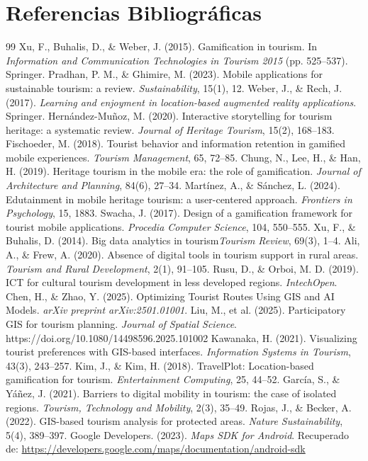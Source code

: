 \documentclass[12pt]{article}
\begin{document}
\section{Referencias Bibliográficas}

\begin{thebibliography}{99}
     Xu, F., Buhalis, D., \& Weber, J. (2015). Gamification in tourism. In \textit{Information and Communication Technologies in Tourism 2015} (pp. 525–537). Springer.
     Pradhan, P. M., \& Ghimire, M. (2023). Mobile applications for sustainable tourism: a review. \textit{Sustainability}, 15(1), 12.
     Weber, J., \& Rech, J. (2017). \textit{Learning and enjoyment in location-based augmented reality applications}. Springer.
     Hernández-Muñoz, M. (2020). Interactive storytelling for tourism heritage: a systematic review. \textit{Journal of Heritage Tourism}, 15(2), 168–183.
     Fischoeder, M. (2018). Tourist behavior and information retention in gamified mobile experiences. \textit{Tourism Management}, 65, 72–85.
     Chung, N., Lee, H., \& Han, H. (2019). Heritage tourism in the mobile era: the role of gamification. \textit{Journal of Architecture and Planning}, 84(6), 27–34.
     Martínez, A., \& Sánchez, L. (2024). Edutainment in mobile heritage tourism: a user-centered approach. \textit{Frontiers in Psychology}, 15, 1883.
     Swacha, J. (2017). Design of a gamification framework for tourist mobile applications. \textit{Procedia Computer Science}, 104, 550–555.
     Xu, F., \& Buhalis, D. (2014). Big data analytics in tourism\textit{Tourism Review}, 69(3), 1–4.
     Ali, A., \& Frew, A. (2020). Absence of digital tools in tourism support in rural areas. \textit{Tourism and Rural Development}, 2(1), 91–105.
     Rusu, D., \& Orboi, M. D. (2019). ICT for cultural tourism development in less developed regions. \textit{IntechOpen}.
     Chen, H., \& Zhao, Y. (2025). Optimizing Tourist Routes Using GIS and AI Models. \textit{arXiv preprint arXiv:2501.01001}.
     Liu, M., et al. (2025). Participatory GIS for tourism planning. \textit{Journal of Spatial Science}. https://doi.org/10.1080/14498596.2025.101002
     Kawanaka, H. (2021). Visualizing tourist preferences with GIS-based interfaces. \textit{Information Systems in Tourism}, 43(3), 243–257.
     Kim, J., \& Kim, H. (2018). TravelPlot: Location-based gamification for tourism. \textit{Entertainment Computing}, 25, 44–52.
     García, S., \& Yáñez, J. (2021). Barriers to digital mobility in tourism: the case of isolated regions. \textit{Tourism, Technology and Mobility}, 2(3), 35–49.
     Rojas, J., \& Becker, A. (2022). GIS-based tourism analysis for protected areas. \textit{Nature Sustainability}, 5(4), 389–397.
    Google Developers. (2023). \textit{Maps SDK for Android}. Recuperado de: \url{https://developers.google.com/maps/documentation/android-sdk}


\end{thebibliography}
\end{document}
